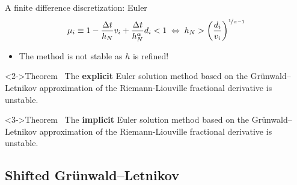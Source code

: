 \documentclass[aspectratio=169,xcolor=dvipsnames]{beamer}
\begin{document}
\begin{frame}{A finite difference discretization:  Euler}
	\[
	\mu_i \equiv 1 - \frac{\Delta t}{h_N} v_i + \frac{\Delta t}{h_N^\alpha} d_i < 1 \;\Leftrightarrow\; h_N > \left(\frac{d_i}{v_i}\right)^{\nicefrac{1}{\alpha - 1}}
	\]
	\begin{itemize}
		\item[\alert{\faExclamationTriangle}] The method is not stable as $h$ is refined!
	\end{itemize}
	\begin{alertblock}<2->{Theorem~\parencite{MR2091131}}
	The \textbf{explicit} Euler solution method based on the Gr\"unwald--Letnikov approximation of the Riemann-Liouville fractional derivative is unstable.
	\end{alertblock}

	\begin{alertblock}<3->{Theorem~\parencite{MR2091131}}
	The \textbf{implicit} Euler solution method based on the Gr\"unwald--Letnikov approximation of the Riemann-Liouville fractional derivative is unstable.
	\end{alertblock}

\end{frame}

\subsection{Shifted Gr\"unwald--Letnikov}
\end{document}
